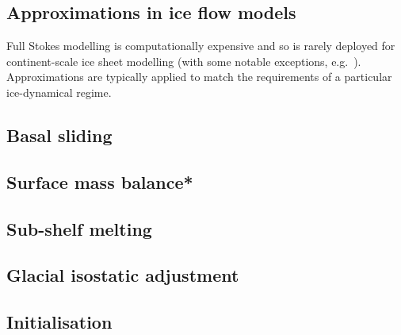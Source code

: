 \subsection{Approximations in ice flow models}

Full Stokes modelling is computationally expensive and so is rarely deployed for continent-scale ice sheet modelling (with some notable exceptions, e.g.~\citealt{seddikSimulationsGreenlandIce2012}). Approximations are typically applied to match the requirements of a particular ice-dynamical regime.

\subsection{Basal sliding}\label{sec:sliding}
\subsection{Surface mass balance*}
\subsection{Sub-shelf melting}
\subsection{Glacial isostatic adjustment}




\subsection{Initialisation}

